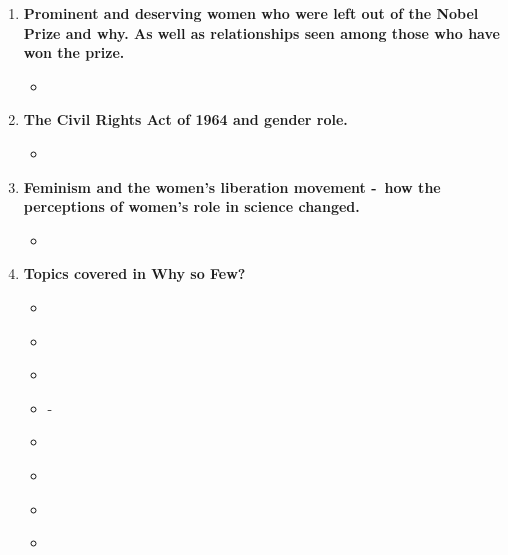 \documentclass[12pt,a4paper]{article}
\begin{document}
\begin{enumerate}
\begin{itemize}
    \end{itemize}
    \item {} \textbf{Prominent and deserving women who were left out of the Nobel Prize and why. As well as relationships seen among those who have won the prize.}
    \begin{itemize}
      \item
    \end{itemize}
    \item {} \textbf{The Civil Rights Act of 1964 and gender role.}
    \begin{itemize}
      \item 
    \end{itemize}
    \item {} \textbf{Feminism and the women’s liberation movement -\ how the perceptions of women's role in science changed.}
    \begin{itemize}
      \item
    \end{itemize}
    \item \textbf{Topics covered in Why so Few?}
    \begin{itemize} 
      \item \href{https://www.cbs.com/shows/60_minutes/video/YPhAPrmoPNXU6EEPdRzkbcRP7oM_1RuR/grace-hopper-she-taught-computers-to-talk/}{}
      \item {} \href{https://www.youtube.com/watch?v=01ZrwW9C5z0}{}
      \item {} 
      \item {}  -\ 
      \item {}
      \item {} \href{https://www.npr.org/sections/money/2014/10/21/357629765/when-women-stopped-coding}{}
      \item {} \href{https://www.theverge.com/2017/8/16/16153740/tech-diversity-problem-science-history-explainer-inequality}{}
      \item {} \href{https://www.aauw.org/resources/research/the-stem-gap/}{} %

\end{itemize}
\end{enumerate}
\end{document}
